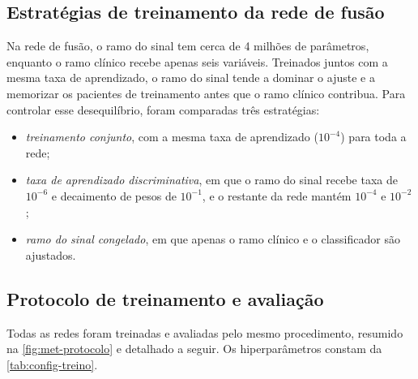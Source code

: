 \subsection{Estratégias de treinamento da rede de fusão}
\label{subsec:met-fusao}

Na rede de fusão, o ramo do sinal tem cerca de 4 milhões de parâmetros,
enquanto o ramo clínico recebe apenas seis variáveis. Treinados juntos com a
mesma taxa de aprendizado, o ramo do sinal tende a dominar o ajuste e a
memorizar os pacientes de treinamento antes que o ramo clínico contribua.
Para controlar esse desequilíbrio, foram comparadas três estratégias:

\begin{itemize}
	\item \textit{treinamento conjunto}, com a mesma taxa de aprendizado
	      ($10^{-4}$) para toda a rede;
	\item \textit{taxa de aprendizado discriminativa}, em que o ramo do sinal
	      recebe taxa de $10^{-6}$ e decaimento de pesos de $10^{-1}$, e o restante
	      da rede mantém $10^{-4}$ e $10^{-2}$;
	\item \textit{ramo do sinal congelado}, em que apenas o ramo clínico e o
	      classificador são ajustados.
\end{itemize}

\subsection{Protocolo de treinamento e avaliação}
\label{subsec:met-protocolo-redes}

Todas as redes foram treinadas e avaliadas pelo mesmo procedimento,
resumido na \autoref{fig:met-protocolo} e detalhado a seguir. Os
hiperparâmetros constam da \autoref{tab:config-treino}.


